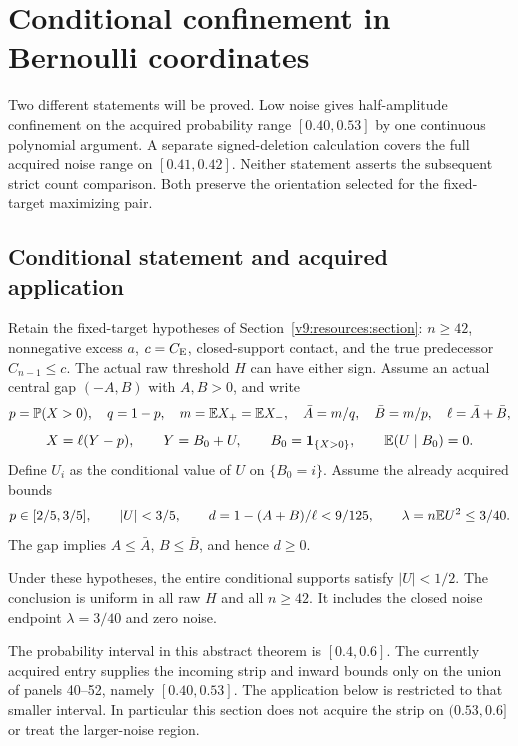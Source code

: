 \section{Conditional confinement in Bernoulli coordinates}
\label{v9:confinement:section}

Two different statements will be proved. Low noise gives half-amplitude
confinement on the acquired probability range $[0.40,0.53]$ by one
continuous polynomial argument. A separate signed-deletion calculation
covers the full acquired noise range on $[0.41,0.42]$. Neither statement
asserts the subsequent strict count comparison. Both preserve the
orientation selected for the fixed-target maximizing pair.

\subsection{Conditional statement and acquired application}
Retain the fixed-target hypotheses of Section~\ref{v9:resources:section}:
$n\ge42$, nonnegative excess $a$, $c=C_{\mathrm E}$, closed-support
contact, and the true predecessor $C_{n-1}\le c$. The actual raw threshold
$H$ can have either sign. Assume an actual central gap $(-A,B)$ with
$A,B>0$, and write
\[
 p=\mathbb P(X>0),\quad q=1-p,\quad m=\mathbb E X_+=\mathbb E X_-,\quad
 \bar A=m/q,\quad \bar B=m/p,\quad \ell=\bar A+\bar B,
\]
\[
 X=\ell(Y-p),\qquad Y=B_0+U,\qquad
 B_0=\mathbf1_{\{X>0\}},\qquad \mathbb E(U\mid B_0)=0.
\]
Define $U_i$ as the conditional value of $U$ on $\{B_0=i\}$.
Assume the already acquired bounds
\begin{equation}\label{v9:confinement:entry}
 p\in[2/5,3/5],\qquad |U|<3/5,\qquad
 d=1-(A+B)/\ell<9/125,
 \qquad \lambda=n\mathbb E U^2\le3/40.
\end{equation}
The gap implies $A\le\bar A$, $B\le\bar B$, and hence $d\ge0$.

\begin{theorem}\label{v9:confinement:theorem}
Under these hypotheses, the entire conditional supports satisfy
$|U|<1/2$. The conclusion is uniform in all raw $H$ and all $n\ge42$.
It includes the closed noise endpoint $\lambda=3/40$ and zero noise.
\end{theorem}

The probability interval in this abstract theorem is $[0.4,0.6]$.
The currently acquired entry supplies the incoming strip and inward bounds
only on the union of panels 40--52, namely $[0.40,0.53]$. The application
below is restricted to that smaller interval. In particular this section
does not acquire the strip on $(0.53,0.6]$ or treat the larger-noise region.

